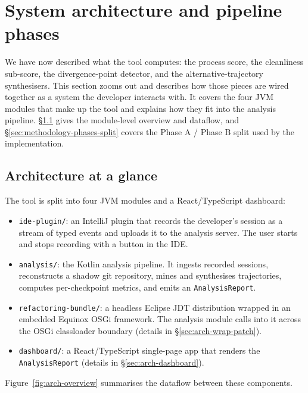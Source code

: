 \section{System architecture and pipeline phases}
\label{sec:arch-phases}

We have now described what the tool computes: the process score, the cleanliness sub-score, the divergence-point detector, and the alternative-trajectory synthesisers. This section zooms out and describes how those pieces are wired together as a system the developer interacts with. It covers the four JVM modules that make up the tool and explains how they fit into the analysis pipeline. \S\ref{sec:arch-overview} gives the module-level overview and dataflow, and \S\ref{sec:methodology-phases-split} covers the Phase A / Phase B split used by the implementation.

\subsection{Architecture at a glance}
\label{sec:arch-overview}

The tool is split into four JVM modules and a React/TypeScript dashboard:

\begin{itemize}
  \item \texttt{ide-plugin/}: an IntelliJ plugin that records the developer's session as a stream of typed events and uploads it to the analysis server. The user starts and stops recording with a button in the IDE.
  \item \texttt{analysis/}: the Kotlin analysis pipeline. It ingests recorded sessions, reconstructs a shadow git repository, mines and synthesises trajectories, computes per-checkpoint metrics, and emits an \texttt{AnalysisReport}.
  \item \texttt{refactoring-bundle/}: a headless Eclipse JDT distribution wrapped in an embedded Equinox OSGi framework. The analysis module calls into it across the OSGi class\-loader boundary (details in \S\ref{sec:arch-wrap-patch}).
  \item \texttt{dashboard/}: a React/TypeScript single-page app that renders the \texttt{AnalysisReport} (details in \S\ref{sec:arch-dashboard}).
\end{itemize}

Figure~\ref{fig:arch-overview} summarises the dataflow between these components.

